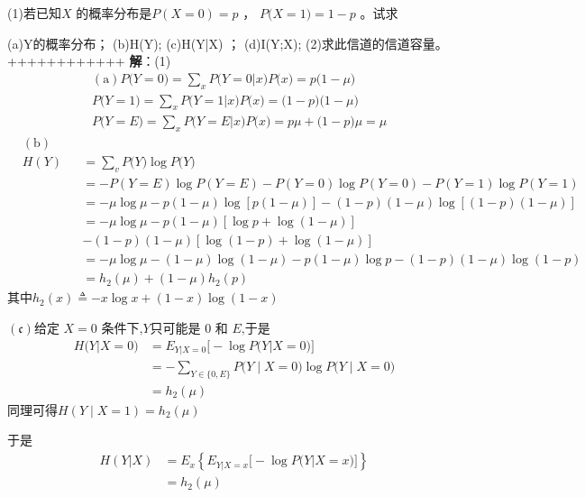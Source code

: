 \documentclass[utf8]{article}
\begin{document}
(1)若已知$X$ 的概率分布是$P(X=0)=p$ ， $P\big(X=1\big)=1-p$ 。试求

(a)Y的概率分布；
(b)H(Y);
(c)H(Y|X) ；
(d)I(Y;X); 
(2)求此信道的信道容量。
++++++++++++
\textbf{解}：(1) $$\begin{aligned}
&\mathrm{(a)} P\big(Y=0\big)=\sum_{x}P\big(Y=0 | x\big)P\big(x\big)=p\big(1-\mu\big) \\
&P\big(Y=1\big)=\sum_xP\big(Y=1 | x\big)P\big(x\big)=\big(1-p\big)\big(1-\mu\big) \\
&P\big(Y=E\big)=\sum_xP\big(Y=E | x\big)P\big(x\big)=p \mu+\big(1-p\big)\mu=\mu 
\end{aligned}$$$$\begin{aligned}
& \mathrm{(b)} \\
&H(Y)&& =\sum_vP\big(Y\big)\log P\big(Y\big) \\
&&&=-P(Y=E)\log P(Y=E)-P(Y=0)\log P(Y=0)-P(Y=1)\log P(Y=1) \\
&&&=-\mu\log\mu-p\left(1-\mu\right)\log\left[p\left(1-\mu\right)\right]-(1-p)(1-\mu)\log\left[(1-p)(1-\mu)\right] \\
&&&=-\mu\log\mu-p\left(1-\mu\right)\left[\log p+\log\left(1-\mu\right)\right] \\
&&&-(1-p)(1-\mu)[\log(1-p)+\log(1-\mu)] \\
&&&=-\mu\log\mu-(1-\mu)\log(1-\mu)-p(1-\mu)\log p-(1-p)(1-\mu)\log(1-p) \\
&&&=h_{2}(\mu)+(1-\mu)h_{2}(p)
\end{aligned}$$
其中$h_2\left(x\right)\triangleq-x\log x+\left(1-x\right)\log\left(1-x\right)$


$(\mathfrak{c})\text{给定 }X=0\text{ 条件下,}Y\text{只可能是 }0\text{ 和 }E\text{,于是}$$$\begin{aligned}
H\big(Y | X=0\big)& =E_{Y|X=0}\Big[-\log P\Big(Y | X=0\Big)\Big] \\
&=-\sum_{Y\in\{0,E\}}P\big(Y\mid X=0\big)\log P\big(Y\mid X=0\big) \\
&=h_{2}(\mu)
\end{aligned}$$同理可得$H\left(Y\mid X=1\right)=h_2\left(\mu\right)$

于是$$\begin{aligned}
H\left(Y|X\right)& =E_{x}\left\{E_{Y|X=x}\Big[-\log P\big(Y | X=x\big)\Big]\right\} \\
&=h_{2}(\mu)
\end{aligned}$$
\end{document}

